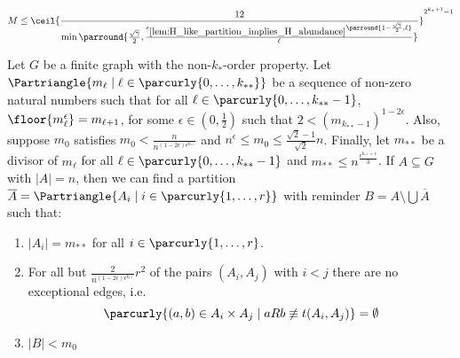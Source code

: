 
            \[
                M \leq \ceil{\frac{12}{\min\parround{\frac{\sqrt{\gamma}}{2}, \frac{\epsilon_{\ref{lem:H_like_partition_implies_H_abundance}}
                    \parround{1 - \frac{\sqrt{\gamma}}{2}, \ell}}{\ell}}}}^{2^{k_*+1}-1}
            \]


    \begin{lemma}[Claim 4.14] \label{lem:existance_of_equitative_partition_with_bound_exceptional_pairs}
        Let $G$ be a finite graph with the non-$k_{*}$-order property.
        Let $\Partriangle{m_\ell \mid \ell \in \parcurly{0, \dots, k_{**}}}$ be a sequence of non-zero natural numbers such that
        for all $\ell \in \parcurly{0, \dots, k_{**}-1}$, $\floor{m_\ell^\epsilon} = m_{\ell+1}$,
        for some $\epsilon \in (0, \frac{1}{2})$ such that $2 < (m_{k_{**}-1})^{1-2\epsilon}$.
        Also, suppose $m_0$ satisfies $m_0 < \frac{n}{n^{(1 - 2\epsilon)\epsilon^{k_{**}}}}$ and
        $n^\epsilon \leq m_0 \leq \frac{\sqrt{2}-1}{\sqrt{2}} n$.
        Finally, let $m_{**}$ be a divisor of $m_\ell$ for all $\ell \in \parcurly{0, \dots, k_{**}-1}$ and
        $m_{**} \leq n^{\frac{\epsilon^{k_{**}+1}}{3}}$.
        If $A \subseteq G$ with $|A| = n$, then we can find a partition $\overline{A} = \Partriangle{A_i \mid i \in \parcurly{1, \dots, r}}$
        with reminder $B = A \setminus \bigcup \overline{A}$ such that:
        \begin{enumerate}
            \item \label{itm:existance_of_equitative_partition_with_bound_exceptional_pairs.1} $|A_i| = m_{**}$ for all $i \in \parcurly{1, \dots, r}$.
            \item \label{itm:existance_of_equitative_partition_with_bound_exceptional_pairs.2} For all but $\frac{2}{n^{(1-2\epsilon)\epsilon^{k_{**}}}}r^2$ of the pairs
                $(A_i, A_j)$ with $i<j$ there are no exceptional edges, i.e.
                \[
                    \parcurly{(a,b) \in A_i \times A_j \mid a R b \not\equiv t(A_i, A_j)} = \emptyset
                \]
            \item \label{itm:existance_of_equitative_partition_with_bound_exceptional_pairs.3} $|B| < m_0$

\end{enumerate}
\end{lemma}
